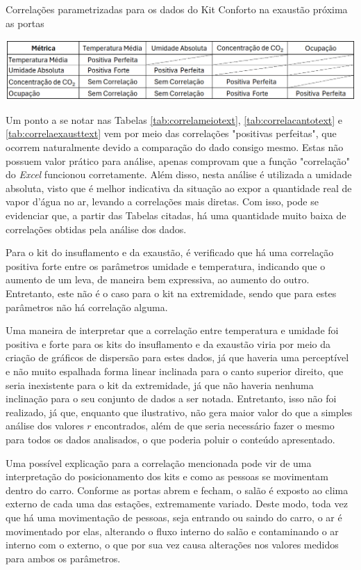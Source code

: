 \documentclass[acronym,symbols,table]{fei}
\begin{document}
\begin{table}[!htb]
 \centering
    \caption{Correlações parametrizadas para os dados do Kit Conforto na exaustão próxima as portas}
    \includegraphics[width=1\linewidth]{Tabelas/correlaexausttext2.png}
    \label{tab:correlaexausttext}
\end{table}
\newpage

Um ponto a se notar nas Tabelas \ref{tab:correlameiotext}, \ref{tab:correlacantotext} e \ref{tab:correlaexausttext} vem por meio das correlações "positivas perfeitas", que ocorrem naturalmente devido a comparação do dado consigo mesmo. Estas não possuem valor prático para análise, apenas comprovam que a função "correlação" do \textit{Excel} funcionou corretamente. Além disso, nesta análise é utilizada a umidade absoluta, visto que é melhor indicativa da situação ao expor a quantidade real de vapor d'água no ar, levando a correlações mais diretas. Com isso, pode se evidenciar que, a partir das Tabelas citadas, há uma quantidade muito baixa de correlações obtidas pela análise dos dados. 

Para o kit do insuflamento e da exaustão, é verificado que há uma correlação positiva forte entre os parâmetros umidade e temperatura, indicando que o aumento de um leva, de maneira bem expressiva, ao aumento do outro. Entretanto, este não é o caso para o kit na extremidade, sendo que para estes parâmetros não há correlação alguma. 

Uma maneira de interpretar que a correlação entre temperatura e umidade foi positiva e forte para os kits do insuflamento e da exaustão viria por meio da criação de gráficos de dispersão para estes dados, já que haveria uma perceptível e não muito espalhada forma linear inclinada para o canto superior direito, que seria inexistente para o kit da extremidade, já que não haveria nenhuma inclinação para o seu conjunto de dados a ser notada. Entretanto, isso não foi realizado, já que, enquanto que ilustrativo, não gera maior valor do que a simples análise dos valores $r$ encontrados, além de que seria necessário fazer o mesmo para todos os dados analisados, o que poderia poluir o conteúdo apresentado.

Uma possível explicação para a correlação mencionada pode vir de uma interpretação do posicionamento dos kits e como as pessoas se movimentam dentro do carro. Conforme as portas abrem e fecham, o salão é exposto ao clima externo de cada uma das estações, extremamente variado. Deste modo, toda vez que há uma movimentação de pessoas, seja entrando ou saindo do carro, o ar é movimentado por elas, alterando o fluxo interno do salão e contaminando o ar interno com o externo, o que por sua vez causa alterações nos valores medidos para ambos os parâmetros. 
\end{document}
